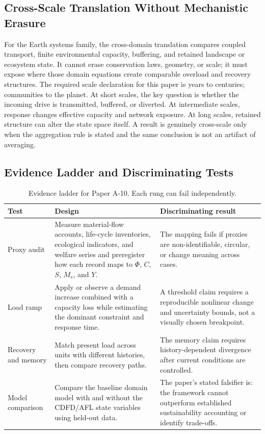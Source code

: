 \documentclass[11pt,a4paper]{article}
\begin{document}
\subsection{Cross-Scale Translation Without Mechanistic Erasure}

For the Earth systems family, the cross-domain translation compares coupled transport, finite environmental capacity, buffering, and retained landscape or ecosystem state. It cannot erase conservation laws, geometry, or scale; it must expose where those domain equations create comparable overload and recovery structures. \cite{Holling1973,Turing1952,BakTangWiesenfeld1987}
The required scale declaration for this paper is years to centuries; communities to the planet. At short
scales, the key question is whether the incoming drive is transmitted,
buffered, or diverted. At intermediate scales, response changes effective
capacity and network exposure. At long scales, retained structure can alter the
state space itself. A result is genuinely cross-scale only when the aggregation
rule is stated and the same conclusion is not an artifact of averaging.

\subsection{Evidence Ladder and Discriminating Tests}

\begin{table}[htbp]
\centering
\small
\caption{Evidence ladder for Paper A-10. Each rung can fail independently.}
\begin{tabularx}{\textwidth}{|p{}|X|X|}
\hline
\textbf{Test} & \textbf{Design} & \textbf{Discriminating result} \\
\hline
Proxy audit & Measure material-flow accounts, life-cycle inventories, ecological indicators, and welfare series and preregister how each record maps to $\Phi$, $C$, $S$, $M_s$, and $Y$. & The mapping fails if proxies are non-identifiable, circular, or change meaning across cases. \\
\hline
Load ramp & Apply or observe a demand increase combined with a capacity loss while estimating the dominant constraint and response time. & A threshold claim requires a reproducible nonlinear change and uncertainty bounds, not a visually chosen breakpoint. \\
\hline
Recovery and memory & Match present load across units with different histories, then compare recovery paths. & The memory claim requires history-dependent divergence after current conditions are controlled. \\
\hline
Model comparison & Compare the baseline domain model with and without the CDFD/AFL state variables using held-out data. & The paper's stated falsifier is: the framework cannot outperform established sustainability accounting or identify trade-offs. \\
\hline
\end{tabularx}
\end{table}
\end{document}
